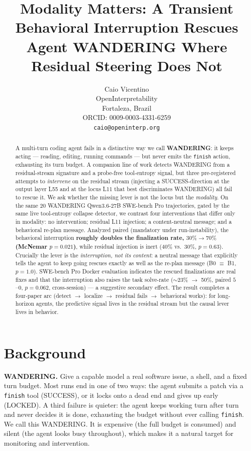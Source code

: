\documentclass[11pt]{article}
\title{Modality Matters: A Transient Behavioral Interruption Rescues \\
Agent WANDERING Where Residual Steering Does Not}
\author{%
  Caio Vicentino \\
  OpenInterpretability \\
  Fortaleza, Brazil \\
  ORCID: 0009-0003-4331-6259 \\
  \texttt{caio@openinterp.org}%
}
\begin{document}
\maketitle

\begin{abstract}
A multi-turn coding agent fails in a distinctive way we call \textbf{WANDERING}: it keeps acting --- reading, editing, running commands --- but never emits the \texttt{finish} action, exhausting its turn budget. A companion line of work detects WANDERING from a residual-stream signature and a probe-free tool-entropy signal, but three pre-registered attempts to \emph{intervene} on the residual stream (injecting a SUCCESS-direction at the output layer L55 and at the locus L11 that best discriminates WANDERING) all fail to rescue it. We ask whether the missing lever is not the locus but the \emph{modality}. On the same 20 WANDERING Qwen3.6-27B SWE-bench Pro trajectories, gated by the same live tool-entropy collapse detector, we contrast four interventions that differ only in modality: no intervention; residual L11 injection; a content-neutral message; and a behavioral re-plan message. Analyzed paired (mandatory under run-instability), the behavioral interruption \textbf{roughly doubles the finalization rate, $30\% \to 70\%$ (McNemar $p=0.021$)}, while residual injection is inert ($40\%$ vs.\ $30\%$, $p=0.63$). Crucially the lever is the \emph{interruption, not its content}: a neutral message that explicitly tells the agent to keep going rescues exactly as well as the re-plan message (B0 $\equiv$ B1, $p=1.0$). SWE-bench Pro Docker evaluation indicates the rescued finalizations are real fixes and that the interruption also raises the task solve-rate ($\sim$23\% $\to$ 50\%, paired $5$--$0$, $p=0.062$, cross-session) --- a suggestive secondary effect. The result completes a four-paper arc (detect $\to$ localize $\to$ residual fails $\to$ behavioral works): for long-horizon agents, the predictive signal lives in the residual stream but the causal lever lives in behavior.
\end{abstract}

\section{Background}\label{sec:background}

\textbf{WANDERING.} Give a capable model a real software issue, a shell, and a fixed turn budget. Most runs end in one of two ways: the agent submits a patch via a \texttt{finish} tool (SUCCESS), or it locks onto a dead end and gives up early (LOCKED). A third failure is quieter: the agent keeps working turn after turn and never decides it is done, exhausting the budget without ever calling \texttt{finish}. We call this WANDERING. It is expensive (the full budget is consumed) and silent (the agent looks busy throughout), which makes it a natural target for monitoring and intervention.
\end{document}
